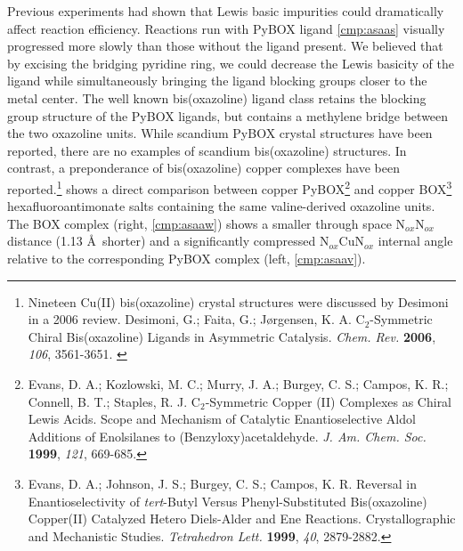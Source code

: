 Previous experiments had shown that Lewis basic impurities could dramatically affect reaction
efficiency. Reactions run with PyBOX ligand \ref{cmp:asaas} visually progressed more slowly than
those without the ligand present. We believed that by excising the bridging pyridine ring, we
could decrease the Lewis basicity of the ligand while simultaneously bringing the ligand blocking
groups closer to the metal center. The well known bis(oxazoline) ligand class retains the blocking
group structure of the PyBOX ligands, but contains a methylene bridge between the two oxazoline
units. While scandium PyBOX crystal structures have been reported, there are no examples of scandium
bis(oxazoline) structures. In contrast, a preponderance of bis(oxazoline) copper
complexes have been reported.\footnote{Nineteen Cu(II) bis(oxazoline) crystal
structures were discussed by Desimoni in a 2006 review. {\frenchspacing Desimoni, G.; Faita, G.;
J\o rgensen, K.
A.
C$_2$-Symmetric Chiral Bis(oxazoline) Ligands in Asymmetric Catalysis. \textit{Chem. Rev.}
\textbf{2006}, \textit{106}, 3561-3651.} \label{ref:asboxreview}} 
shows a direct comparison between copper PyBOX\footnote{{\frenchspacing Evans, D. A.; Kozlowski, M. C.; Murry, J. A.; Burgey,
C. S.; Campos, K. R.; Connell, B. T.; Staples, R. J. C$_2$-Symmetric Copper (II) Complexes as Chiral
Lewis Acids. Scope and Mechanism of Catalytic Enantioselective Aldol Additions of Enolsilanes to
(Benzyloxy)acetaldehyde. \textit{J. Am. Chem. Soc.} \textbf{1999}, \textit{121}, 669-685.}} and
copper BOX\footnote{{\frenchspacing Evans, D. A.; Johnson, J. S.; Burgey, C. S.; Campos,
K. R. Reversal in Enantioselectivity of \textit{tert}-Butyl Versus Phenyl-Substituted Bis(oxazoline)
Copper(II) Catalyzed Hetero Diels-Alder and Ene Reactions. Crystallographic and Mechanistic Studies.
\textit{Tetrahedron Lett.} \textbf{1999}, \textit{40}, 2879-2882.}} hexafluoroantimonate salts
containing the same valine-derived oxazoline units. The BOX complex (right,
\ref{cmp:asaaw}) shows a smaller through space N$_{ox}$\ce{-}N$_{ox}$ distance (1.13 \AA\  shorter)
and a significantly compressed N$_{ox}$\ce{-}Cu\ce{-}N$_{ox}$ internal angle relative to the
corresponding PyBOX complex (left, \ref{cmp:asaav}).
